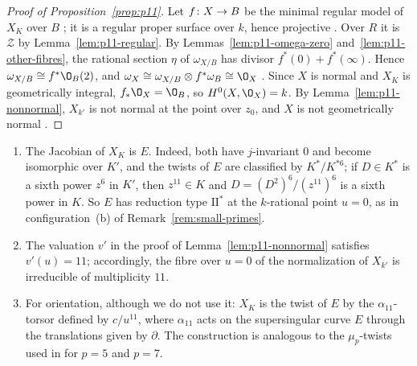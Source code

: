 \begin{proof}[Proof of Proposition~\textup{\ref{prop:p11}}]
Let $f\colon X\to B$ be the minimal regular model of $X_K$ over $B$ \cite[Section~9.3]{Liu02}; it is a regular proper surface over $k$, hence projective \cite[Remark~9.3.5]{Liu02}.
Over $R$ it is $\mathcal Z$ by Lemma~\ref{lem:p11-regular}.
By Lemmas~\ref{lem:p11-omega-zero} and~\ref{lem:p11-other-fibres}, the rational section $\eta$ of $\omega_{X/B}$ has divisor $f^*(0)+f^*(\infty)$.
Hence $\omega_{X/B}\cong f^*\O_B(2)$, and $\omega_X\cong\omega_{X/B}\otimes f^*\omega_B\cong\O_X$ \cite[Theorem~6.4.9]{Liu02}.
Since $X$ is normal and $X_K$ is geometrically integral, $f_*\O_X = \O_B$, so $H^0(X,\O_X) = k$.
By Lemma~\ref{lem:p11-nonnormal}, $X_{k'}$ is not normal at the point over $z_0$, and $X$ is not geometrically normal \cite[Tag~]{Stacks}.
\end{proof}

\begin{remark}\label{rem:p11}
\begin{enumerate}
\item The Jacobian of $X_K$ is $E$.
  Indeed, both have $j$-invariant $0$ and become isomorphic over $K'$, and the twists of $E$ are classified by $K^*/K^{*6}$; if $D\in K^*$ is a sixth power $z^6$ in $K'$, then $z^{11}\in K$ and $D = (D^2)^6/(z^{11})^6$ is a sixth power in $K$.
  So $E$ has reduction type $\mathrm{II}^*$ at the $k$-rational point $u = 0$, as in configuration~\textup{(b)} of Remark~\ref{rem:small-primes}.
\item The valuation $v'$ in the proof of Lemma~\ref{lem:p11-nonnormal} satisfies $v'(u) = 11$; accordingly, the fibre over $u = 0$ of the normalization of $X_{k'}$ is irreducible of multiplicity $11$.
\item For orientation, although we do not use it: $X_K$ is the twist of $E$ by the $\alpha_{11}$-torsor defined by $c/u^{11}$, where $\alpha_{11}$ acts on the supersingular curve $E$ through the translations given by $\partial$.
  The construction is analogous to the $\mu_p$-twists used in \cite[Example~6.2]{WZ26} for $p = 5$ and $p = 7$.
\end{enumerate}
\end{remark}
